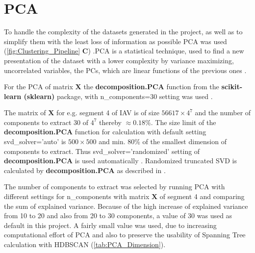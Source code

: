 \section{PCA} \label{sec:PCA}

To handle the complexity of the datasets generated in the project, as well as to simplify them with the least loss of information as possible \gls{PCA} was used (\autoref{fig:Clustering_Pipeline} \textsf{\textbf{C}}) \autocite{pearson_liii_1901}.\gls{PCA} is a statistical technique, used to find a new presentation of the dataset with a lower complexity by variance maximizing, uncorrelated variables, the \glspl{PC}, which are linear functions of the previous ones \autocite{jolliffe_principal_2016}. 

For the \gls{PCA} of matrix $\mathbf{X}$ the \textbf{decomposition.PCA} function from the \textbf{scikit-learn (sklearn)} package, with \colorbox{backcolour}{n\_components=30} setting was used \autocite{pedregosa_scikit-learn_2011}.

The matrix of $\mathbf{X}$ for e.g. segment 4 of \gls{IAV} is of size $56617 \times 4^7$ and the number of components to extract 30 of $4^7$ thereby $\approx 0.18\%$. The size limit of the \textbf{decomposition.PCA} function for calculation with default setting \colorbox{backcolour}{svd\_solver='auto'} is $500 \times 500$ and min. 80\% of the smallest dimension of components to extract. Thus \colorbox{backcolour}{svd\_solver='randomized'} setting of \textbf{decomposition.PCA} is used automatically \autocite{pedregosa_scikit-learn_2011}. Randomized truncated \gls{SVD} is calculated by \textbf{decomposition.PCA} as described in \textcite{halko_finding_2010}.

The number of components to extract was selected by running \gls{PCA} with different settings for \colorbox{backcolour}{n\_components} with matrix $\mathbf{X}$ of segment 4 and comparing the sum of explained variance. Because of the high increase of explained variance from 10 to 20 and also from 20 to 30 components, a value of 30 was used as default in this project. A fairly small value was used, due to increasing computational effort of \gls{PCA} and also to preserve the usability of Spanning Tree calculation with \gls{HDBSCAN} (\autoref{tab:PCA_Dimension}).

